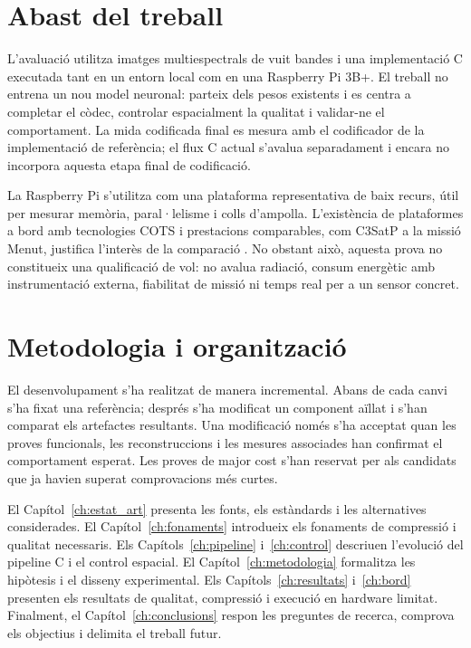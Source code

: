 \section{Abast del treball}\label{sec:abast}

L'avaluació utilitza imatges multiespectrals de vuit bandes i una
implementació C executada tant en un entorn local com en una Raspberry Pi 3B+.
El treball no entrena un nou model neuronal: parteix dels pesos existents i es
centra a completar el còdec, controlar espacialment la qualitat i validar-ne
el comportament. La mida codificada final es mesura amb el codificador de la
implementació de referència; el flux C actual s'avalua separadament i encara no
incorpora aquesta etapa final de codificació.

La Raspberry Pi s'utilitza com una plataforma representativa de baix recurs,
útil per mesurar memòria, paral·lelisme i colls d'ampolla. L'existència de
plataformes a bord amb tecnologies COTS i prestacions comparables, com C3SatP a
la missió Menut, justifica l'interès de la comparació
\cite{schwaller2017a53,serra2024c3satp}. No obstant això, aquesta prova no
constitueix una qualificació de vol: no avalua radiació, consum energètic amb
instrumentació externa, fiabilitat de missió ni temps real per a un sensor
concret.

\section{Metodologia i organització}\label{sec:metodologia_organitzacio}

El desenvolupament s'ha realitzat de manera incremental. Abans de cada canvi
s'ha fixat una referència; després s'ha modificat un component aïllat i s'han
comparat els artefactes resultants. Una modificació només s'ha acceptat quan
les proves funcionals, les reconstruccions i les mesures associades han
confirmat el comportament esperat. Les proves de major cost s'han reservat per
als candidats que ja havien superat comprovacions més curtes.

El Capítol~\ref{ch:estat_art} presenta les fonts, els estàndards i les
alternatives considerades. El Capítol~\ref{ch:fonaments} introdueix els
fonaments de compressió i qualitat necessaris. Els Capítols~\ref{ch:pipeline}
i~\ref{ch:control} descriuen l'evolució del pipeline C i el control espacial.
El Capítol~\ref{ch:metodologia} formalitza les hipòtesis i el disseny
experimental. Els Capítols~\ref{ch:resultats} i~\ref{ch:bord} presenten els
resultats de qualitat, compressió i execució en hardware limitat. Finalment,
el Capítol~\ref{ch:conclusions} respon les preguntes de recerca, comprova els
objectius i delimita el treball futur.
